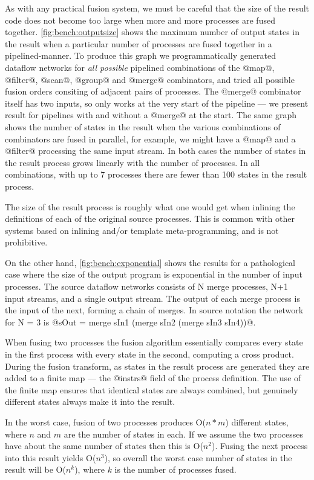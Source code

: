 As with any practical fusion system, we must be careful that the size of the result code does not become too large when more and more processes are fused together.
\autoref{fig:bench:outputsize} shows the maximum number of output states in the result when a particular number of processes are fused together in a pipelined-manner.
To produce this graph we programmatically generated dataflow networks for \emph{all possible} pipelined combinations of the @map@, @filter@, @scan@, @group@ and @merge@ combinators, and tried all possible fusion orders consiting of adjacent pairs of processes.
The @merge@ combinator itself has two inputs, so only works at the very start of the pipeline --- we present result for pipelines with and without a @merge@ at the start.
The same graph shows the number of states in the result when the various combinations of combinators are fused in parallel, for example, we might have a @map@ and a @filter@ processing the same input stream.
In both cases the number of states in the result process grows linearly with the number of processes. In all combinations, with up to 7 processes there are fewer than 100 states in the result process. 

The size of the result process is roughly what one would get when inlining the definitions of each of the original source processes. This is common with other systems based on inlining and/or template meta-programming, and is not prohibitive.

On the other hand, \autoref{fig:bench:exponential} shows the results for a pathological case where the size of the output program is exponential in the number of input processes. The source dataflow networks consists of N merge processes, N+1 input streams, and a single output stream. The output of each merge process is the input of the next, forming a chain of merges. In source notation the network for N = 3 is @sOut = merge sIn1 (merge sIn2 (merge sIn3 sIn4))@.

When fusing two processes the fusion algorithm essentially compares every state in the first process with every state in the second, computing a cross product. During the fusion transform, as states in the result process are generated they are added to a finite map --- the @instrs@ field of the process definition. The use of the finite map ensures that identical states are always combined, but genuinely different states always make it into the result. 

In the worst case, fusion of two processes produces O($n*m$) different states, where $n$ and $m$ are the number of states in each. If we assume the two processes have about the same number of states then this is O($n^2$). Fusing the next process into this result yields O($n^3$), so overall the worst case number of states in the result will be O($n^k$), where $k$ is the number of processes fused. 

